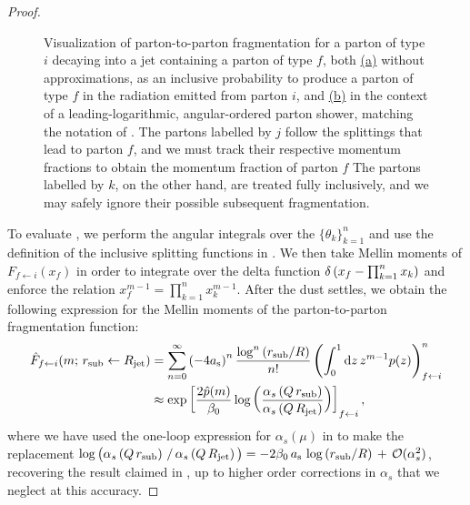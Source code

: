 \begin{proof}
\begin{figure}[t!]
    \caption[Visualization of parton-to-parton fragmentation for a parton of type \(i\) decaying into a jet containing a parton of type \(f\).]
    {
        Visualization of parton-to-parton fragmentation for a parton of type \(i\) decaying into a jet containing a parton of type \(f\), both
        \hyperref[fig:shower:cartoon:fragmentation1]{(a)}
        without approximations, as an inclusive probability to produce a parton of type \(f\) in the radiation emitted from parton \(i\), and
        \hyperref[fig:shower:cartoon:fragmentation2]{(b)}
        in the context of a leading-logarithmic, angular-ordered parton shower, matching the notation of .
        The partons labelled by \(j\) follow the splittings that lead to parton \(f\), and we must track their respective momentum fractions to obtain the momentum fraction of parton \(f\)
        The partons labelled by \(k\), on the other hand, are treated fully inclusively, and we may safely ignore their possible subsequent fragmentation.
    }

    \label{fig:shower:cartoon:fragmentation}
\end{figure}




To evaluate , we perform the angular integrals over the \(\{\theta_k\}_{k = 1}^n\) and use the definition of the inclusive splitting functions in .
%
We then take Mellin moments of \(F_{f\leftarrow i}(x_f)\) in order to integrate over the delta function \(\delta \left(x_f - \prod_{k=1}^n x_k\right)\) and enforce the relation \(x_f^{m-1} = \prod_{k=1}^n x_k^{m-1}\).
%
After the dust settles, we obtain the following expression for the Mellin moments of the parton-to-parton fragmentation function:
\begin{subequations}
\label{eq:ll_fragmentation_repeat}
\begin{align}
    \label{eq:ll_fragmentation_angle}
    \hat{F}_{f \leftarrow i}(m;\,\rsub \leftarrow \Rjet)
    &=
    \sum_{n=0}^\infty
    \le(-4\as\ri)^n
    \frac{\log^n\le(\rsub/R\ri)}{n!}
    \le(
        \int_0^1 \dd z\,
        z^{m-1} p(z)
    \ri)^n_{f\leftarrow i}
    \\
    &\approx
    \exp\le[
        \frac{2\hat{p}(m)}{\beta_0}
        \log\le(
        \frac{
            \alpha_s\le(Q\,\rsub\ri)
        }{
            \alpha_s\le(Q\,\Rjet\ri)
        }\ri)
    \ri]_{f \leftarrow i}
    ,
\end{align}
\end{subequations}
where we have used the one-loop expression for \(\alpha_s(\mu)\) in  to make the replacement \(
    \log\big(
        \alpha_s\left(Q\,r_\text{sub}\right)
        \,/\,
        \alpha_s\left(Q\,R_\text{jet}\right)
    \big)
    =
    -2 \beta_0 \, a_{\mathrm{s}} \,
    \log\left(r_\text{sub}/R\right)
    \,
    +
    \,
    \mathcal{O}(\alpha_s^2)
\), recovering the result claimed in , up to higher order corrections in \(\alpha_s\) that we neglect at this accuracy.
\end{proof}


